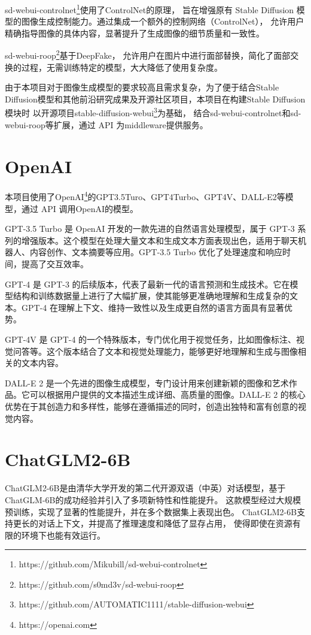 \documentclass[a4paper,AutoFakeBold,oneside,12pt]{book}
\begin{document}
sd-webui-controlnet\footnote{https://github.com/Mikubill/sd-webui-controlnet}使用了ControlNet\cite{zhang2023adding}的原理，
旨在增强原有 Stable Diffusion 模型的图像生成控制能力。通过集成一个额外的控制网络（ControlNet），
允许用户精确指导图像的具体内容，显著提升了生成图像的细节质量和一致性。

sd-webui-roop\footnote{https://github.com/s0md3v/sd-webui-roop}基于DeepFake\cite{van2021deepfake}，
允许用户在图片中进行面部替换，简化了面部交换的过程，无需训练特定的模型，大大降低了使用复杂度。

由于本项目对于图像生成模型的要求较高且需求复杂，为了便于结合Stable Diffusion模型和其他前沿研究成果及开源社区项目，本项目在构建Stable Diffusion模块时
以开源项目stable-diffusion-webui\footnote{https://github.com/AUTOMATIC1111/stable-diffusion-webui}为基础，
结合sd-webui-controlnet和sd-webui-roop等扩展，通过 API 为middleware提供服务。

\section{OpenAI}
本项目使用了OpenAI\footnote{https://openai.com}的GPT3.5Turo、GPT4Turbo、GPT4V、DALL-E2等模型，通过 API 调用OpenAI的模型。

GPT-3.5 Turbo 是 OpenAI 开发的一款先进的自然语言处理模型，属于 GPT-3 系列的增强版本。这个模型在处理大量文本和生成文本方面表现出色，适用于聊天机器人、内容创作、文本摘要等应用。GPT-3.5 Turbo 优化了处理速度和响应时间，提高了交互效率。

GPT-4 是 GPT-3 的后续版本，代表了最新一代的语言预测和生成技术。它在模型结构和训练数据量上进行了大幅扩展，使其能够更准确地理解和生成复杂的文本。GPT-4 在理解上下文、维持一致性以及生成更自然的语言方面具有显著优势。

GPT-4V 是 GPT-4 的一个特殊版本，专门优化用于视觉任务，比如图像标注、视觉问答等。这个版本结合了文本和视觉处理能力，能够更好地理解和生成与图像相关的文本内容。

DALL-E 2 是一个先进的图像生成模型，专门设计用来创建新颖的图像和艺术作品。它可以根据用户提供的文本描述生成详细、高质量的图像。DALL-E 2 的核心优势在于其创造力和多样性，能够在遵循描述的同时，创造出独特和富有创意的视觉内容。

\section{ChatGLM2-6B}
ChatGLM2-6B是由清华大学开发的第二代开源双语（中英）对话模型，基于ChatGLM-6B的成功经验并引入了多项新特性和性能提升。
这款模型经过大规模预训练，实现了显著的性能提升，并在多个数据集上表现出色。
ChatGLM2-6B支持更长的对话上下文，并提高了推理速度和降低了显存占用，
使得即使在资源有限的环境下也能有效运行。
\end{document}
